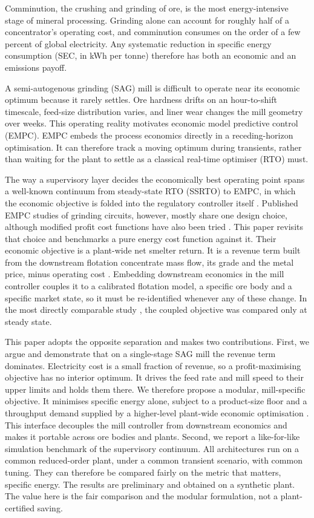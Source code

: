 \documentclass[conference]{IEEEtran}
\begin{document}
Comminution, the crushing and grinding of ore, is the most energy-intensive
stage of mineral processing. Grinding alone can account for roughly half of
a concentrator's operating cost, and comminution consumes on the order of a
few percent of global electricity. Any systematic reduction in specific
energy consumption (SEC, in kWh per tonne) therefore has both an
economic and an emissions payoff.

A semi-autogenous grinding (SAG) mill is difficult to operate near its
economic optimum because it rarely settles. Ore hardness drifts on an
hour-to-shift timescale, feed-size distribution varies, and liner wear
changes the mill geometry over weeks. This operating reality motivates
economic model predictive control (EMPC). EMPC embeds the process
economics directly in a receding-horizon optimisation. It can therefore
track a moving optimum during transients, rather than waiting for the
plant to settle as a classical real-time optimiser (RTO) must.

The way a supervisory layer decides the economically best operating point
spans a well-known continuum from steady-state RTO (SSRTO) to EMPC, in
which the economic objective is folded into the regulatory controller
itself \cite{matias2022,ellis2017}. Published EMPC studies of
grinding circuits, however, mostly share one design choice, although
modified profit cost functions have also been tried \cite{thivierge2023}.
This paper revisits that choice and benchmarks a pure energy cost
function against it. Their economic objective is a plant-wide net
smelter return. It
is a revenue term built from the downstream flotation concentrate mass
flow, its grade and the metal price, minus operating cost
\cite{leroux2019,thivierge2023}. Embedding downstream economics in the
mill controller couples it to a calibrated flotation model, a specific ore
body and a specific market state, so it must be re-identified whenever any
of these change. In the most directly comparable study
\cite{thivierge2023}, the coupled objective was compared only at steady
state.

This paper adopts the opposite separation and makes two contributions.
First, we argue and demonstrate that on a single-stage SAG mill the
revenue term dominates. Electricity cost is a small fraction of revenue,
so a profit-maximising objective has no interior optimum. It drives the
feed rate and mill speed to their upper limits and holds them there. We
therefore propose a modular, mill-specific objective. It minimises
specific energy alone, subject to a product-size floor and a throughput
demand supplied by a higher-level plant-wide economic optimisation
\cite{leroux2019}. This interface decouples the mill controller from
downstream economics and makes it portable across ore bodies and plants.
Second, we report a like-for-like simulation benchmark of the supervisory
continuum. All architectures run on a common reduced-order plant, under a
common transient scenario, with common tuning. They can therefore be
compared fairly on the metric that matters, specific energy. The results
are preliminary and obtained on a synthetic plant. The value here is the
fair comparison and the modular formulation, not a plant-certified
saving.
\end{document}
